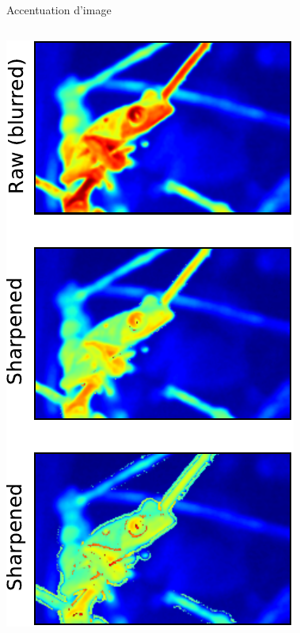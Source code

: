 \documentclass[8pt,a4paper]{beamer}
\begin{document}
\begin{frame}[containsverbatim]{Accentuation d'image}
  \begin{columns}
  \includegraphics[width=\textwidth]{figures/grenouille_sharpen.pdf} 
  
    \end{columns}
\end{frame}  
\end{document}

